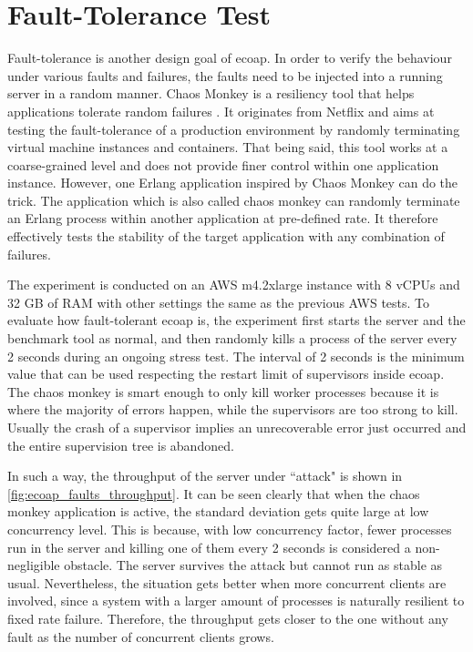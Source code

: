 \section{Fault-Tolerance Test}

Fault-tolerance is another design goal of ecoap. In order to verify the behaviour under various faults and failures, the faults need to be injected into a running server in a random manner. Chaos Monkey is a resiliency tool that helps applications tolerate random failures \autocite{chaos_monkey_netflix}. It originates from Netflix and aims at testing the fault-tolerance of a production environment by randomly terminating virtual machine instances and containers. That being said, this tool works at a coarse-grained level and does not provide finer control within one application instance. However, one Erlang application inspired by Chaos Monkey can do the trick. The application which is also called chaos monkey \autocite{chaos_monkey_erl} can randomly terminate an Erlang process within another application at pre-defined rate. It therefore effectively tests the stability of the target application with any combination of failures. 

The experiment is conducted on an AWS m4.2xlarge instance with 8 vCPUs and 32 GB of RAM with other settings the same as the previous AWS tests. To evaluate how fault-tolerant ecoap is, the experiment first starts the server and the benchmark tool as normal, and then randomly kills a process of the server every 2 seconds during an ongoing stress test. The interval of 2 seconds is the minimum value that can be used respecting the restart limit of supervisors inside ecoap. The chaos monkey is smart enough to only kill worker processes because it is where the majority of errors happen, while the supervisors are too strong to kill. Usually the crash of a supervisor implies an unrecoverable error just occurred and the entire supervision tree is abandoned. 

In such a way, the throughput of the server under ``attack" is shown in \autoref{fig:ecoap_faults_throughput}. It can be seen clearly that when the chaos monkey application is active, the standard deviation gets quite large at low concurrency level. This is because, with low concurrency factor, fewer processes run in the server and killing one of them every 2 seconds is considered a non-negligible obstacle. The server survives the attack but cannot run as stable as usual. Nevertheless, the situation gets better when more concurrent clients are involved, since a system with a larger amount of processes is naturally resilient to fixed rate failure. Therefore, the throughput gets closer to the one without any fault as the number of concurrent clients grows. 

